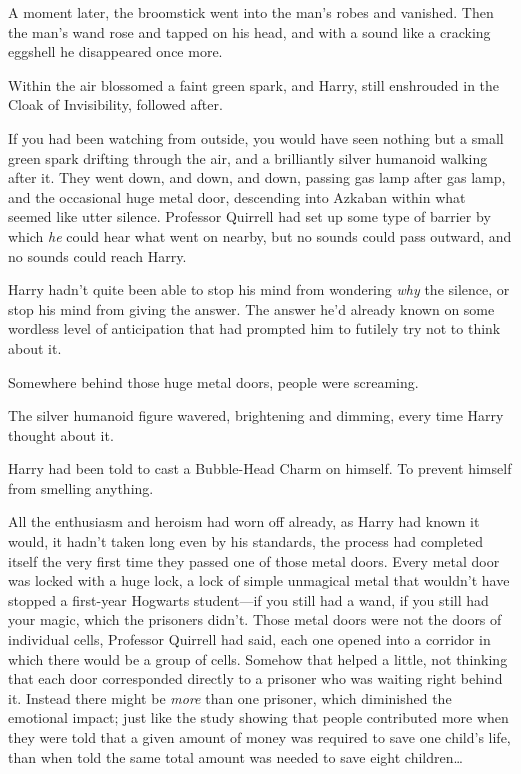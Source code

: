 A moment later, the broomstick went into the man's robes and vanished. Then the 
man's wand rose and tapped on his head, and with a sound like a cracking 
eggshell he disappeared once more.

Within the air blossomed a faint green spark, and Harry, still enshrouded in 
the Cloak of Invisibility, followed after.

If you had been watching from outside, you would have seen nothing but a small 
green spark drifting through the air, and a brilliantly silver humanoid walking 
after it.
\sbreak
They went down, and down, and down, passing gas lamp after gas lamp, and the 
occasional huge metal door, descending into Azkaban within what seemed like 
utter silence. Professor Quirrell had set up some type of barrier by which 
\emph{he} could hear what went on nearby, but no sounds could pass outward, and 
no sounds could reach Harry.

Harry hadn't quite been able to stop his mind from wondering \emph{why} the 
silence, or stop his mind from giving the answer. The answer he'd already known 
on some wordless level of anticipation that had prompted him to futilely try 
not to think about it.

Somewhere behind those huge metal doors, people were screaming.

The silver humanoid figure wavered, brightening and dimming, every time Harry 
thought about it.

Harry had been told to cast a Bubble-Head Charm on himself. To prevent himself 
from smelling anything.

All the enthusiasm and heroism had worn off already, as Harry had known it 
would, it hadn't taken long even by his standards, the process had completed 
itself the very first time they passed one of those metal doors. Every metal 
door was locked with a huge lock, a lock of simple unmagical metal that 
wouldn't have stopped a first-year Hogwarts student---if you still had a wand, 
if you still had your magic, which the prisoners didn't. Those metal doors were 
not the doors of individual cells, Professor Quirrell had said, each one opened 
into a corridor in which there would be a group of cells. Somehow that helped a 
little, not thinking that each door corresponded directly to a prisoner who was 
waiting right behind it. Instead there might be \emph{more} than one prisoner, 
which diminished the emotional impact; just like the study showing that people 
contributed more when they were told that a given amount of money was required 
to save one child's life, than when told the same total amount was needed to 
save eight children{\ldots}


